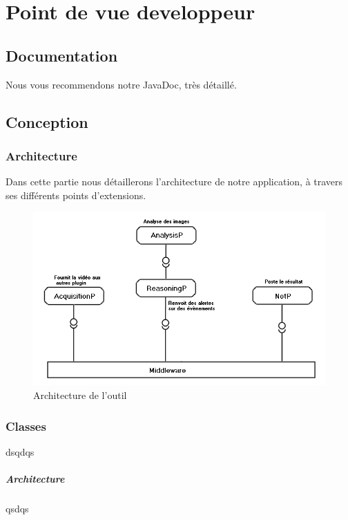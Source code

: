 \chapter{Point de vue developpeur}

\section{Documentation}
	Nous vous recommendons notre JavaDoc, très détaillé.
\clearpage

\section{Conception}
	\subsection{Architecture}
	Dans cette partie nous détaillerons l'architecture de notre application, à travers ses différents points d'extensions.
	\begin{figure}[!htbp]
	  \centering
	  \includegraphics[scale=0.50]{img/archi}
	  \caption{Architecture de l'outil}
	  \label{fig:archi}
	\end{figure}

	\subsection{Classes}
	dsqdqs
		\paragraph{Architecture}
		qsdqs

